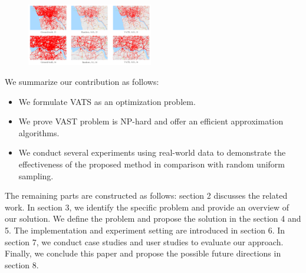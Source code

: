 \begin{figure}[t]
	\centering
	\includegraphics[width=0.49\textwidth]{pictures/introduction/compare.pdf}
	\vspace{-5mm}
	\caption{ }
	\vspace{-5mm}
	\label{fig:compare}
\end{figure}

We summarize our contribution as follows:
\begin{itemize}[noitemsep]
  \item We formulate VATS as an optimization problem.
  \item We prove VAST problem is NP-hard and offer an efficient approximation algorithms. 
  \item We conduct several experiments using real-world data to demonstrate the effectiveness of the proposed method in comparison with random uniform sampling.
\end{itemize}


The remaining parts are constructed as follows: section 2 discusses the related work. In section 3, we identify the specific problem and provide an overview of our solution. We define the problem and propose the solution in the section 4 and 5. The implementation and experiment setting are introduced in section 6. 
In section 7, we conduct case studies and user studies to evaluate our approach. Finally, we conclude this paper and propose the possible future directions in section 8.
